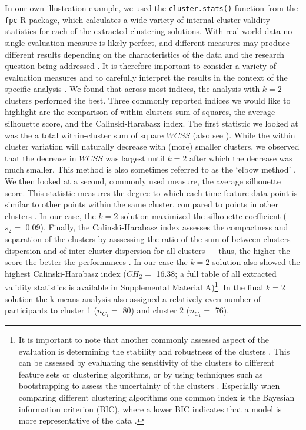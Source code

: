 In our own illustration example, we used the \texttt{cluster.stats()}
function from the \texttt{fpc} \textsf{R} package, which calculates a
wide variety of internal cluster validity statistics for each of the
extracted clustering solutions. With real-world data no single
evaluation measure is likely perfect, and different measures may produce
different results depending on the characteristics of the data and the
research question being addressed \citep{kittler1998}. It is therefore
important to consider a variety of evaluation measures and to carefully
interpret the results in the context of the specific analysis
\citep{vinh2009}. We found that across most indices, the analysis with
\(k=2\) clusters performed the best. Three commonly reported indices we
would like to highlight are the comparison of within clusters sum of
squares, the average silhouette score, and the Calinski-Harabasz index.
The first statistic we looked at was the a total within-cluster sum of
square \(WCSS\) (also see ). While the within cluster
variation will naturally decrease with (more) smaller clusters, we
observed that the decrease in \(WCSS\) was largest until \(k=2\) after
which the decrease was much smaller. This method is also sometimes
referred to as the `elbow method' \citep{syakur2018}. We then looked at
a second, commonly used measure, the average silhouette score. This
statistic measures the degree to which each time feature data point is
similar to other points within the same cluster, compared to points in
other clusters \citep{rousseeuw1987}. In our case, the \(k=2\) solution
maximized the silhouette coefficient (\(s_2=\) 0.09). Finally, the
Calinski-Harabasz index assesses the compactness and separation of the
clusters by asssessing the ratio of the sum of between-clusters
dispersion and of inter-cluster dispersion for all clusters --- thus,
the higher the score the better the performances \citep{calinski1974}.
In our case the \(k=2\) solution also showed the highest
Calinski-Harabasz index (\(CH_2=\) 16.38; a full table of all extracted
validity statistics is available in Supplemental Material
A)\footnote{It is important to note that another commonly assessed aspect of the evaluation is determining the stability and robustness of the clusters \citep{berkhin2006}. This can be assessed by evaluating the sensitivity of the clusters to different feature sets or clustering algorithms, or by using techniques such as bootstrapping to assess the uncertainty of the clusters \citep{vinh2009}. Especially when comparing different clustering algorithms one common index is the Bayesian information criterion (BIC), where a lower BIC indicates that a model is more representative of the data \citep{vandeschoot2017}.}.
In the final \(k=2\) solution the k-means analysis also assigned a
relatively even number of participants to cluster 1 (\(n_{C_1}=\) 80)
and cluster 2 (\(n_{C_1}=\) 76).

